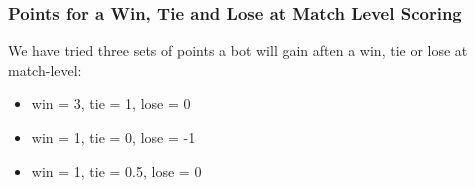 





 
\subsubsection{Points for a Win, Tie and Lose at Match Level Scoring}
We have tried three sets of points a bot will gain aften a win, tie or lose at match-level:
\begin{itemize}
\item win = 3, tie = 1, lose = 0
\item win = 1, tie = 0, lose = -1
\item win = 1, tie = 0.5, lose = 0
\end{itemize}

